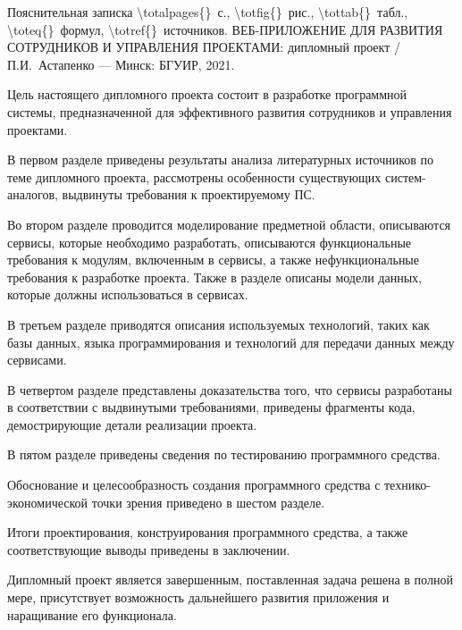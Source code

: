 \thispagestyle{empty}


\begin{center}
    Пояснительная записка \num{\totalpages{}}~с., \num{\totfig{}}~рис., \num{\tottab{}}~табл., \num{\toteq{}}~формул, \num{\totref{}}~источников.
	\MakeUppercase{Веб-приложение для развития сотрудников и управления проектами}: дипломный проект / П.И.~Астапенко — Минск: БГУИР, 2021.
\end{center}

Цель настоящего дипломного проекта состоит в разработке программной системы, предназначенной для эффективного развития сотрудников и управления проектами.

В первом разделе приведены результаты анализа литературных источников по теме дипломного проекта, рассмотрены особенности существующих систем-ана\-логов, выдвинуты требования к проектируемому ПС. 

Во втором разделе проводится моделирование предметной области, описываются сервисы, которые необходимо разработать, описываются функциональные требования к модулям, включенным в сервисы, а также нефункциональные требования к разработке проекта. Также в разделе описаны модели данных, которые должны использоваться в сервисах. 

В третьем разделе приводятся описания используемых технологий, таких как базы данных, языка программирования и технологий для передачи данных между сервисами. 

В четвертом разделе представлены доказательства того, что сервисы разработаны в соответствии с выдвинутыми требованиями, приведены фрагменты кода, демострирующие детали реализации проекта. 

В пятом разделе приведены сведения по тестированию программного средства. 

Обоснование и целесообразность создания программного средства с технико-экономической точки зрения приведено в шестом разделе. 

Итоги проектирования, конструирования программного средства, а также соответствующие выводы приведены в заключении.

Дипломный проект является завершенным, поставленная задача решена в полной мере, присутствует возможность дальнейшего развития приложения и наращивание его функционала.

